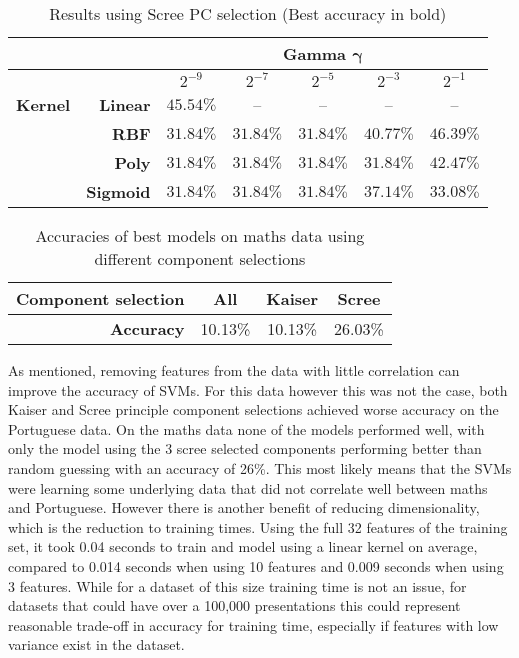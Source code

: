 \documentclass[12pt,a4paper,titlepage,twoside]{report}
\begin{document}
	\begin{table}[h]
		\centering
		\begin{tabular}{|ll|ccccc|}
			\hline
                                      &                                      &   			& \multicolumn{3}{c}{\textbf{Gamma $\boldsymbol{\gamma}$}} &   \\ \hline
                                      &                                      				& $2^{-9}$  		& $2^{-7}$       	& $2^{-5}$      	& $2^{-3}$			& $2^{-1}$ \\ \hline
			\multicolumn{1}{|l|}{\textbf{Kernel}} & \multicolumn{1}{r|}{\textbf{Linear}} 	& $45.54\%$ 	& --  				& --				& --	  			& --			   \\
			\multicolumn{1}{|l|}{\textbf{}}       & \multicolumn{1}{r|}{\textbf{RBF}}    	& $31.84\%$ 	& $31.84\%$  & $31.84\%$  & $40.77\%$  & \boldmath$46.39\%$ \\
			\multicolumn{1}{|l|}{\textbf{}}       & \multicolumn{1}{r|}{\textbf{Poly}}   	& $31.84\%$ 	& $31.84\%$  & $31.84\%$  & $31.84\%$  & $42.47\%$ \\
			\multicolumn{1}{|l|}{\textbf{}}       & \textbf{Sigmoid}                     	& $31.84\%$ 	& $31.84\%$  & $31.84\%$  & $37.14\%$  & $33.08\%$ \\ \hline
		\end{tabular}%
		\caption {Results using Scree PC selection (Best accuracy in bold)} 
		\label{tab:scree-pca-tab}
	\end{table}
	
	\begin{table}[h]
		\centering
		\begin{tabular}{|r| c c c|}
			\hline
			\textbf{Component selection}	& All		& Kaiser	& Scree \\ \hline
			\textbf{Accuracy}				& 10.13\%	& 10.13\%	& 26.03\% \\ 
			\hline
		\end{tabular}
		\caption{Accuracies of best models on maths data using different component selections}
		\label{tab:svm-maths-acc}
	\end{table}		
	
	As mentioned, removing features from the data with little correlation can improve the accuracy of SVMs. For this data however this was not the case, both Kaiser and Scree principle component selections achieved worse accuracy on the Portuguese data. On the maths data none of the models performed well, with only the model using the 3 scree selected components performing better than random guessing with an accuracy of 26\%. This most likely means that the SVMs were learning some underlying data that did not correlate well between maths and Portuguese. 
	However there is another benefit of reducing dimensionality, which is the reduction to training times. Using the full 32 features of the training set, it took 0.04 seconds to train and model using a linear kernel on average, compared to 0.014 seconds when using 10 features and 0.009 seconds when using 3 features. While for a dataset of this size training time is not an issue, for datasets that could have over a 100,000 presentations this could represent reasonable trade-off in accuracy for training time, especially if features with low variance exist in the dataset.
	
\end{document}
